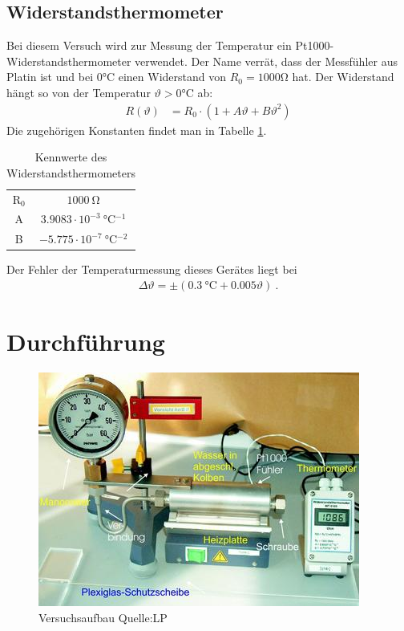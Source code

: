 \documentclass[12pt,a4paper,titlepage,headinclude,bibtotoc]{scrartcl}
\begin{document}
\subsection{Widerstandsthermometer}

Bei diesem Versuch wird zur Messung der Temperatur ein Pt1000-Widerstandsthermometer verwendet.
Der Name verrät, dass der Messfühler aus Platin ist und bei $0\si{\celsius}$ einen Widerstand von $R_0=1000\si{\ohm}$ hat.
Der Widerstand hängt so von der Temperatur $\vartheta>0\si{\celsius}$ ab:
\begin{align}
	R(\vartheta)&=R_0\cdot\left(1 + A\vartheta + B\vartheta^2\right) \label{eq:Pt1000}
\end{align}
Die zugehörigen Konstanten findet man in Tabelle \ref{tab:Pt1000}.

\begin{table}[!htb]
 \centering
 \begin{tabular}{|c|c|}
   \hline
   R$_0$ & $1000 ~ \si{\ohm}$\\
   A   & $3.9083 \cdot 10^{-3} ~ \si{\celsius^{-1}}$\\
   B   & $-5.775 \cdot 10^{-7} ~ \si{\celsius^{-2}}$\\
   \hline
 \end{tabular}
 \caption{Kennwerte des Widerstandsthermometers}
 \label{tab:Pt1000}
\end{table}

Der Fehler der Temperaturmessung dieses Gerätes liegt bei
\begin{align}
	\Delta\vartheta=\pm (0.3~\si{\celsius}+0.005\vartheta)~.
	\label{eq:Pt1000_fehler}
\end{align}


\section{Durchführung}
\label{sec:durchfuehrung}
\begin{figure}[!htb]
	\centering
	\includegraphics[scale=1.0]{Aufbau.jpg}
	\caption{Versuchsaufbau Quelle:LP}	
	\label{fig:Aufbau}
\end{figure}
\end{document}
